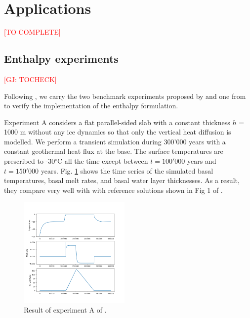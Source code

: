 \documentclass[gmd]{copernicus}
\begin{document}
\section{Applications} 

\textcolor{red}{[TO COMPLETE]} 



\subsection{Enthalpy experiments}

\textcolor{red}{[GJ: TOCHECK]} 

Following \citep{wang2020two}, we carry the two benchmark experiments proposed by 
\citep{kleiner2015enthalpy} and one from \citep{hewitt2017models} to
verify the implementation of the enthalpy formulation.

Experiment A considers a flat parallel-sided slab with a constant thickness $h$ = 1000 m
without any ice dynamics so that only the vertical heat diffusion is modelled. We perform
a transient simulation during 300'000 years with a constant geothermal heat flux at the base. 
The surface temperatures are prescribed to -30$^{\circ}$C all the time except between
$t=100'000$ years and $t=150'000$ years. Fig. \ref{KleinerExpA} 
shows the time series of the simulated basal temperatures,
basal melt rates, and basal water layer thicknesses. As a result, they compare very well with 
with reference solutions shown in Fig 1 of \citep{kleiner2015enthalpy}. 

\begin{figure}[!h]
\begin{center} 
\includegraphics[width=0.48\textwidth]{fig/KleinerExpA.png}   
\end{center}
\caption{ Result of experiment A of \citep{kleiner2015enthalpy}. \label{KleinerExpA}}
\end{figure}
\end{document}
